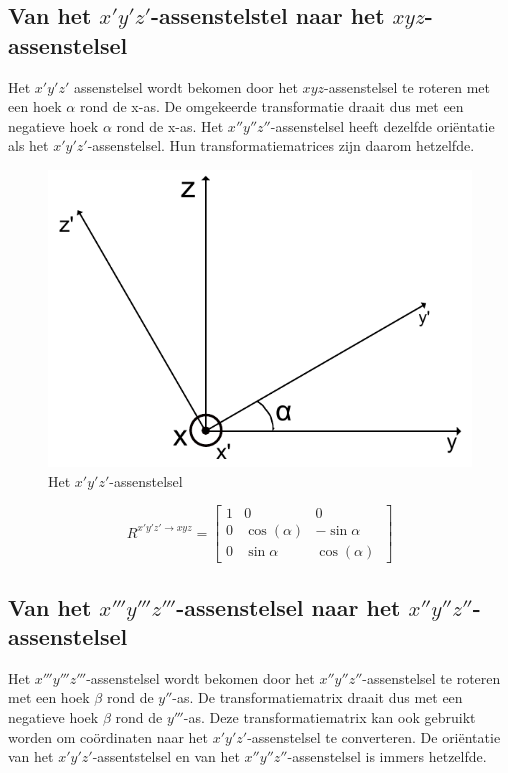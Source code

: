 
\subsection{Van het $x'y'z'$-assenstelstel naar het $xyz$-assenstelsel}
Het $x'y'z'$ assenstelsel wordt bekomen door het $xyz$-assenstelsel te roteren met een hoek $\alpha$ rond de x-as. De omgekeerde transformatie draait dus met een negatieve hoek $\alpha$ rond de x-as. Het $x''y''z''$-assenstelsel heeft dezelfde ori\"entatie als het $x'y'z'$-assenstelsel. Hun transformatiematrices zijn daarom hetzelfde.

\begin{figure}[H]
\centering
\includegraphics[scale=0.5]{x'y'z'.pdf}
\caption{Het $x'y'z'$-assenstelsel}
\end{figure}

\begin{equation*}
R^{x'y'z' \rightarrow xyz}=
  \begin{bmatrix}
    1 & 0 & 0\\
    0 & \cos(\alpha) & -\sin{\alpha}\\ 
    0 & \sin{\alpha} & \cos(\alpha)\
    \end{bmatrix}
\end{equation*}



\subsection{Van het $x'''y'''z'''$-assenstelsel naar het $x''y''z''$-assenstelsel}
Het $x'''y'''z'''$-assenstelsel wordt bekomen door het $x''y''z''$-assenstelsel te roteren met een hoek $\beta$ rond de $y''$-as. De transformatiematrix draait dus met een negatieve hoek $\beta$ rond de $y'''$-as. Deze transformatiematrix kan ook gebruikt worden om co\"ordinaten naar het $x'y'z'$-assenstelsel te converteren. De ori\"entatie van het $x'y'z'$-assentstelsel en van het $x''y''z''$-assenstelsel is immers hetzelfde.

